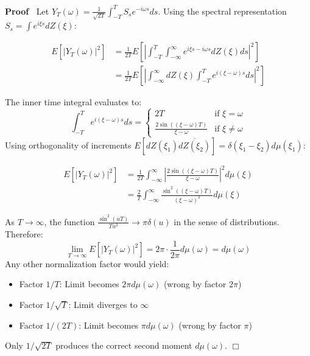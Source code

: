 \documentclass{article}
\newenvironment{proof}{\noindent\textbf{Proof\ }}{\hspace*{\fill}$\Box$\medskip}
\begin{document}
\begin{proof}
  Let $Y_T (\omega) = \frac{1}{\sqrt{2 T}}  \int_{- T}^T S_s e^{- i \omega s}
  ds$. Using the spectral representation $S_s = \int e^{i \xi s} dZ (\xi)$:
  
  \begin{align}
    E [|Y_T (\omega) |^2] & = \frac{1}{2 T} E \left[ \left| \int_{- T}^T
    \int_{- \infty}^{\infty} e^{i \xi s - i \omega s} dZ (\xi) ds \right|^2
    \right] \\
    & = \frac{1}{2 T} E \left[ \left| \int_{- \infty}^{\infty} dZ (\xi)
    \int_{- T}^T e^{i (\xi - \omega) s} ds \right|^2 \right] 
  \end{align}
  
  The inner time integral evaluates to:
  \begin{equation}
    \int_{- T}^T e^{i (\xi - \omega) s} ds = \left\{\begin{array}{ll}
      2 T & \text{if } \xi = \omega\\
      \frac{2 \sin ((\xi - \omega) T)}{\xi - \omega} & \text{if } \xi \neq
      \omega
    \end{array}\right.
  \end{equation}
  Using orthogonality of increments $E [dZ (\xi_1) \overline{dZ (\xi_2)}] =
  \delta (\xi_1 - \xi_2) d \mu (\xi_1)$:
  
  \begin{align}
    E [|Y_T (\omega) |^2] & = \frac{1}{2 T}  \int_{- \infty}^{\infty} \left|
    \frac{2 \sin ((\xi - \omega) T)}{\xi - \omega} \right|^2 d \mu (\xi) \\
    & = \frac{2}{T}  \int_{- \infty}^{\infty} \frac{\sin^2 ((\xi - \omega)
    T)}{(\xi - \omega)^2} d \mu (\xi) 
  \end{align}
  
  As $T \to \infty$, the function $\frac{\sin^2 (uT)}{Tu^2} \to \pi \delta
  (u)$ in the sense of distributions. Therefore:
  \begin{equation}
    \lim_{T \to \infty} E [|Y_T (\omega) |^2] = 2 \pi \cdot \frac{1}{2 \pi} d
    \mu (\omega) = d \mu (\omega)
  \end{equation}
  Any other normalization factor would yield:
  \begin{itemize}
    \item Factor $1 / T$: Limit becomes $2 \pi d \mu (\omega)$ (wrong by
    factor $2 \pi$)
    
    \item Factor $1 / \sqrt{T}$: Limit diverges to $\infty$
    
    \item Factor $1 / (2 T)$: Limit becomes $\pi d \mu (\omega)$ (wrong by
    factor $\pi$)
  \end{itemize}
  Only $1 / \sqrt{2 T}$ produces the correct second moment $d \mu (\omega)$.
\end{proof}
\end{document}
